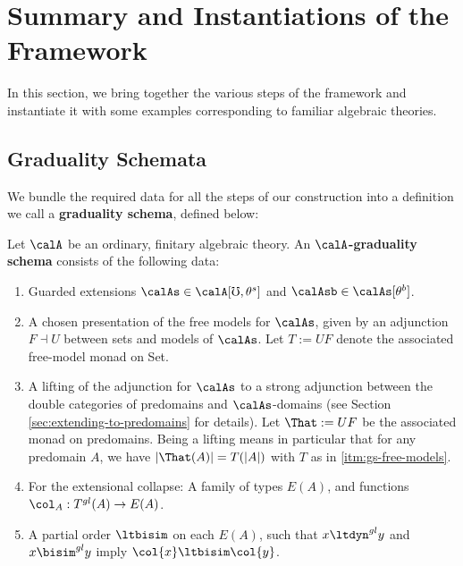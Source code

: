 \documentclass[acmsmall,screen,review,anonymous]{acmart}
\theoremstyle{remark}
\begin{document}
\section{Summary and Instantiations of the Framework}\label{sec:framework}
In this section, we bring together the various steps of the framework and
instantiate it with some examples corresponding to familiar algebraic theories.

\subsection{Graduality Schemata}\label{sec:graduality-shemata}

We bundle the required data for all the steps of our construction into a
definition we call a \textbf{graduality schema}, defined below:
%
\begin{definition}
Let $\calA$ be an ordinary, finitary algebraic theory. An
\textbf{$\calA$-graduality schema} consists of the following data:
%
\begin{enumerate}[label=\textbf{GS.\arabic*}, ref=GS.\arabic*]

\item \label{itm:gs-guarded-extension} Guarded extensions $\calAs \in
\calA[\mho, \theta^s]$ and $\calAsb \in \calAs[\theta^b]$.

\item \label{itm:gs-free-models} A chosen presentation of the free models for
$\calAs$, given by an adjunction $F \dashv U$ between sets and models of
$\calAs$. Let $T := UF$ denote the associated free-model monad on Set.

\item \label{itm:gs-lifting} A lifting of the adjunction for $\calAs$ to a
strong adjunction between the double categories of predomains and
$\calAs$-domains (see Section \ref{sec:extending-to-predomains} for details).
Let $\That := UF$ be the associated monad on predomains. Being a lifting means
in particular that for any predomain $A$, we have $|\That(A)| = T(|A|)$ with $T$
as in \ref{itm:gs-free-models}.



\item \label{itm:gs-collapse} For the extensional collapse: A family of types
$E(A)$, and functions $\col_A : T^{gl}(A) \to E(A)$.

\item \label{itm:gs-ext-ord} A partial order $\ltbisim$ on each $E(A)$, such
that $x \ltdyn^{gl} y$ and $x \bisim^{gl} y$ imply $\col{x} \ltbisim \col{y}$.
\end{enumerate}
\end{definition}
\end{document}
